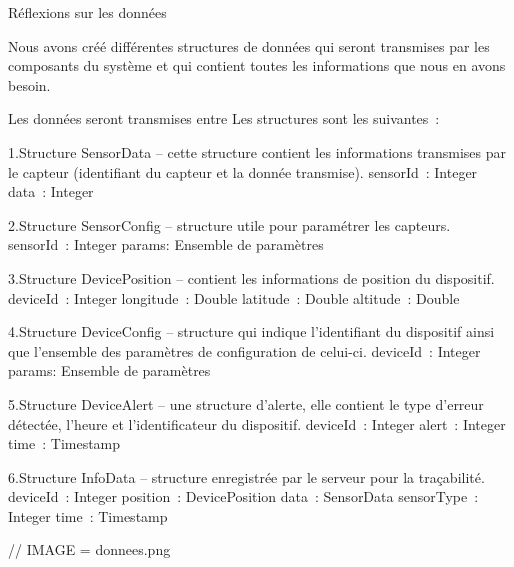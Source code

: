 Réflexions sur les données

Nous avons créé différentes structures de données qui seront transmises par les composants du système et qui contient toutes les informations que nous en avons besoin.

Les données seront transmises entre 
Les structures sont les suivantes :

1.Structure SensorData – cette structure contient les informations transmises par le capteur (identifiant du capteur et la donnée transmise).
sensorId : Integer
data : Integer

2.Structure SensorConfig –  structure utile pour paramétrer les capteurs.
sensorId : Integer
params: Ensemble de paramètres

3.Structure DevicePosition – contient les informations de position du dispositif.
deviceId : Integer
longitude : Double
latitude : Double
altitude : Double

4.Structure DeviceConfig –  structure qui indique l’identifiant du dispositif ainsi que l’ensemble des paramètres de configuration de celui-ci.
deviceId : Integer
params: Ensemble de paramètres

5.Structure DeviceAlert – une structure d'alerte, elle contient le type d'erreur détectée, l'heure et l'identificateur du dispositif.
deviceId : Integer
alert : Integer
time : Timestamp

6.Structure InfoData – structure enregistrée par le serveur pour la traçabilité.
deviceId : Integer
position : DevicePosition
data : SensorData
sensorType : Integer
time : Timestamp

// IMAGE = donnees.png
